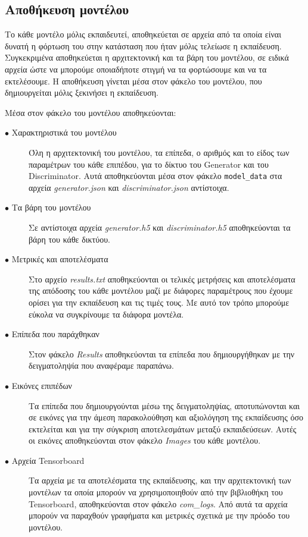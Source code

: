 \subsection{Αποθήκευση μοντέλου}
Το κάθε μοντέλο μόλις εκπαιδευτεί, αποθηκεύεται σε αρχεία από τα οποία είναι δυνατή η φόρτωση του στην κατάσταση που ήταν μόλις τελείωσε η εκπαίδευση. Συγκεκριμένα αποθηκεύεται η αρχιτεκτονική και τα βάρη του μοντέλου, σε ειδικά αρχεία ώστε να μπορούμε οποιαδήποτε στιγμή να τα φορτώσουμε και να τα εκτελέσουμε. Η αποθήκευση γίνεται μέσα στον φάκελο του μοντέλου, που δημιουργείται μόλις ξεκινήσει η εκπαίδευση.
\par
Μέσα στον φάκελο του μοντέλου αποθηκεύονται:
\begin{description}
\item[$\bullet$ Χαρακτηριστικά του μοντέλου] Όλη η αρχιτεκτονική του μοντέλου, τα επίπεδα, ο αριθμός και το είδος των παραμέτρων του κάθε επιπέδου, για το δίκτυο του Generator και του Discriminator. Αυτά αποθηκεύονται μέσα στον φάκελο \texttt{model\_data} στα αρχεία  \textit{generator.json} και \textit{discriminator.json} αντίστοιχα.
\item[$\bullet$ Τα βάρη του μοντέλου] Σε αντίστοιχα αρχεία \textit{generator.h5} και \textit{discriminator.h5} αποθηκεύονται τα βάρη του κάθε δικτύου.
\item[$\bullet$ Μετρικές και αποτελέσματα] Στο αρχείο \textit{results.txt} αποθηκεύονται οι τελικές μετρήσεις και αποτελέσματα της απόδοσης του κάθε μοντέλου μαζί με διάφορες παραμέτρους που έχουμε ορίσει για την εκπαίδευση και τις τιμές τους. Με αυτό τον τρόπο μπορούμε εύκολα να συγκρίνουμε τα διάφορα μοντέλα.
\item[$\bullet$ Επίπεδα που παράχθηκαν] Στον φάκελο \textit{Results} αποθηκεύονται τα επίπεδα που δημιουργήθηκαν με την δειγματοληψία που αναφέραμε παραπάνω.
\item[$\bullet$ Εικόνες επιπέδων] Τα επίπεδα που δημιουργούνται μέσω της δειγματοληψίας, αποτυπώνονται και σε εικόνες για την άμεση παρακολούθηση και αξιολόγηση της εκπαίδευσης όσο εκτελείται και για την σύγκριση αποτελεσμάτων μεταξύ εκπαιδεύσεων. Αυτές οι εικόνες αποθηκεύονται στον φάκελο \textit{Images} του κάθε μοντέλου.
\item[$\bullet$ Αρχεία Tensorboard] Τα αρχεία με τα αποτελέσματα της εκπαίδευσης, και την αρχιτεκτονική των μοντέλων τα οποία μπορούν να χρησιμοποιηθούν από την βιβλιοθήκη του Tensorboard, αποθηκεύονται στον φάκελο \textit{com\_logs}. Από αυτά τα αρχεία μπορούν να παραχθούν γραφήματα και μετρικές σχετικά με την πρόοδο του μοντέλου.
\end{description}

